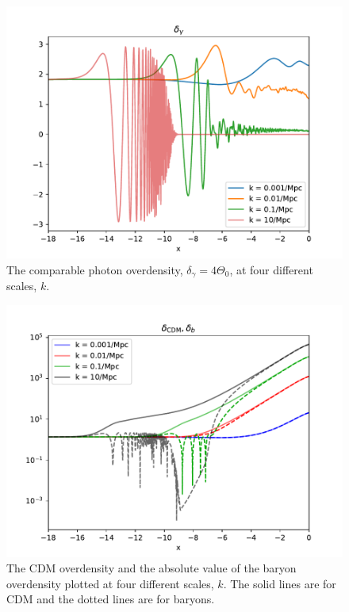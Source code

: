 \documentclass{aa}
\begin{document}


\begin{figure}[h!]
   \includegraphics[scale=0.6]{../figures/milestone3/delta_gamma.pdf}
   \caption{The comparable photon overdensity, $\delta_\gamma = 4\Theta_0$, at four different scales, $k$. }\label{fig:delta_gamma}
\end{figure}

\begin{figure}[h!]
   \includegraphics[scale=0.6]{../figures/milestone3/delta_cdm_delta_b.pdf}
   \caption{The CDM overdensity and the absolute value of the baryon overdensity plotted at four different scales, $k$. The solid lines are for CDM and the dotted lines are for baryons.}\label{fig:delta_cdm_delta_b}
\end{figure}
\end{document}
